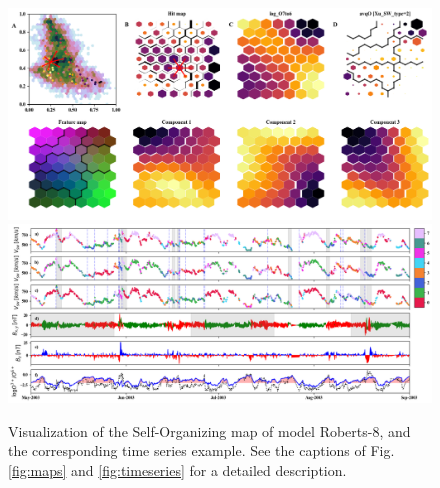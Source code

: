 \documentclass[utf8]{frontiersSCNS} %
\begin{document}
\begin{figure}[h!]
	\begin{center}
		\includegraphics[width=16cm]{Roberts/maps}\\%
			\includegraphics[width=18cm]{Roberts/timeseries}
	\end{center}
	\caption{Visualization of the Self-Organizing map of model Roberts-8, and the corresponding time series example. See the captions of Fig.\ref{fig:maps}  and \ref{fig:timeseries} for a detailed description.}\label{fig:modelR}
\end{figure}


\end{document}
